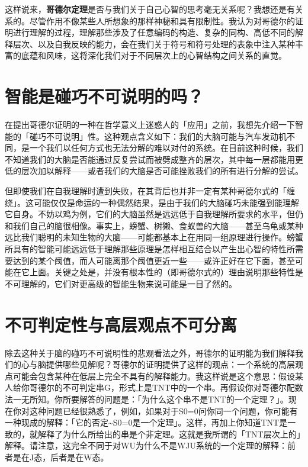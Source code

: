 \documentclass[
  12pt,
  twoside,
  openright,
  oldfontcommands,
]{memoir}
\newcommand{\heititext}[1]{{\heifamily\bfseries #1}}
\begin{document}
这样说来，\heititext{哥德尔定理}是否与我们关于自己心智的思考毫无关系呢？我想还是有关系的。尽管作用不像某些人所想象的那样神秘和具有限制性。我认为对哥德尔的证明进行理解的过程，理解那些涉及了任意编码的构造、复杂的同构、高低不同的解释层次、以及自我反映的能力，会在我们关于符号和符号处理的表象中注入某种丰富的底蕴和风味，这将深化我们对于不同层次上的心智结构之间关系的直觉。

\section{智能是碰巧不可说明的吗？}

在提出哥德尔证明的一种在哲学意义上迷惑人的「应用」之前，我想先介绍一下智能的「碰巧不可说明」性。这种观点含义如下：我们的大脑可能与汽车发动机不同，是一个我们以任何方式也无法分解的难以对付的系统。在目前这种时候，我们不知道我们的大脑是否能通过反复尝试而被劈成整齐的层次，其中每一层都能用更低的层次加以解释------或者我们的大脑是否可能挫败我们的所有进行分解的尝试。

但即使我们在自我理解时遭到失败，在其背后也并非一定有某种哥德尔式的「缠绕」。这可能仅仅是命运的一种偶然结果，是由于我们的大脑碰巧未能强到能理解它自身。不妨以鸡为例，它们的大脑虽然是远远低于自我理解所要求的水平，但仍和我们自己的脑很相像。事实上，螃蟹、树獭、食蚁兽的大脑------甚至乌龟或某种远比我们聪明的未知生物的大脑------可能都基本上在用同一组原理进行操作。螃蟹所具有的智能可能远远低于理解那些原理是怎样相互结合以产生出心智的特性所需要达到的某个阈值，而人可能离那个阈值更近一些------或许正好在它下面，甚至可能在它上面。关键之处是，并没有根本性的（即哥德尔式的）理由说明那些特性是不可理解的，它们对更高级的智能生物来说可能是一目了然的。

\section{不可判定性与高层观点不可分离}

除去这种关于脑的碰巧不可说明性的悲观看法之外，哥德尔的证明能为我们解释我们的心与脑提供哪些见解呢？哥德尔的证明提供了这样的观点：一个系统的高层观点可能会包含某种在低层上完全不具有的解释能力。我这样说是这个意思：假设某人给你哥德尔的不可判定串G，形式上是TNT中的一个串。再假设你对哥德尔配数法一无所知。你所要解答的问题是：「为什么这个串不是TNT的一个定理？」。现在你对这种问题已经很熟悉了，例如，如果对于S0=0问你同一个问题，你可能有一种现成的解释：「它的否定\textasciitilde S0=0是一个定理」。这样，再加上你知道TNT是一致的，就解释了为什么所给出的串是个非定理。这就是我所谓的「TNT层次上的」解释。请注意，这完全不同于对WU为什么不是WJU系统的一个定理的解释：前者是在J态，后者是在W态。
\end{document}
